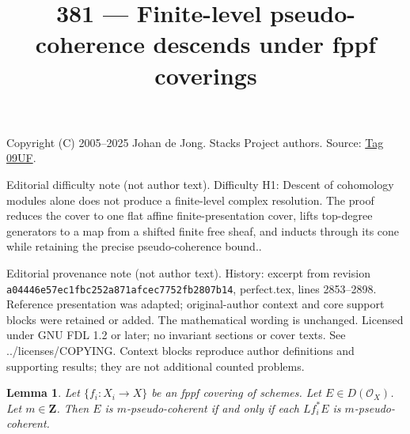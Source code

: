 \documentclass{amsart}
\theoremstyle{plain}
\newtheorem{lemma}[subsection]{Lemma}
\theoremstyle{definition}
\theoremstyle{remark}
\numberwithin{equation}{subsection}
\begin{document}
\title[Stacks Project, Tag 09UF]{381 --- Finite-level pseudo-coherence descends under fppf coverings}
\maketitle
\noindent Copyright (C) 2005--2025 Johan de Jong. Stacks Project authors. Source: \href{https://stacks.math.columbia.edu/tag/09UF}{Tag 09UF}.

\noindent Editorial difficulty note (not author text). Difficulty H1: Descent of cohomology modules alone does not produce a finite-level complex resolution. The proof reduces the cover to one flat affine finite-presentation cover, lifts top-degree generators to a map from a shifted finite free sheaf, and inducts through its cone while retaining the precise pseudo-coherence bound..

\noindent Editorial provenance note (not author text). History: excerpt from revision \texttt{a0444\allowbreak 6e57e\allowbreak c1fbc\allowbreak 252a8\allowbreak 71afc\allowbreak ec775\allowbreak 2fb28\allowbreak 07b14}, perfect.tex, lines 2853--2898. Reference presentation was adapted; original-author context and core support blocks were retained or added. The mathematical wording is unchanged. Licensed under GNU FDL 1.2 or later; no invariant sections or cover texts. See ../licenses/COPYING. Context blocks reproduce author definitions and supporting results; they are not additional counted problems.

\begin{lemma}
\label{lemma-pseudo-coherent-descends-fppf}
Let $\{f_i : X_i \to X\}$ be an fppf covering of schemes. Let
$E \in D(\mathcal{O}_X)$. Let $m \in \mathbf{Z}$.
Then $E$ is $m$-pseudo-coherent if and only if each
$Lf_i^*E$ is $m$-pseudo-coherent.
\end{lemma}
\end{document}
